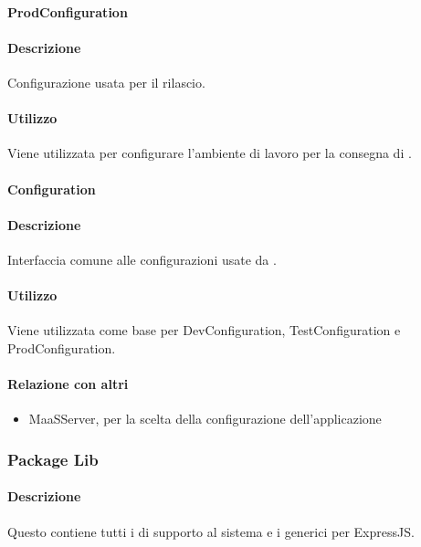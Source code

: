 \paragraph{ProdConfiguration}
\paragraph*{Descrizione}
Configurazione usata per il rilascio.

\paragraph*{Utilizzo}
Viene utilizzata per configurare l'ambiente di lavoro per la consegna di .

\paragraph{Configuration}
\paragraph*{Descrizione}
Interfaccia comune alle configurazioni usate da .

\paragraph*{Utilizzo}
Viene utilizzata come base per DevConfiguration, TestConfiguration e ProdConfiguration.

\paragraph*{Relazione con altri }
\begin{itemize}
\item MaaSServer, per la scelta della configurazione dell'applicazione
\end{itemize}

\subsubsection{Package Lib}
\paragraph*{Descrizione}
Questo  contiene tutti i  di supporto al sistema e i  generici per ExpressJS.

